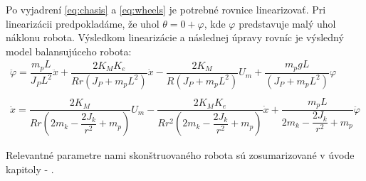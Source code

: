 Po vyjadrení \eqref{eq:chasis} a \eqref{eq:wheels} je potrebné rovnice linearizovať. Pri linearizácii predpokladáme, že uhol $\theta = 0 + \varphi$, kde $\varphi$ predstavuje malý uhol náklonu robota. Výsledkom linearizácie a následnej úpravy rovníc je výsledný model balansujúceho robota:
\begin{equation}
\begin{gathered}
\ddot{\varphi} = \dfrac{m_p L}{J_P L^2}\ddot{x} + \dfrac{2K_M K_e}{Rr(J_P + m_p L^2)}\dot{x} - \dfrac{2K_M}{R(J_P + m_p L^2)} U_m + \dfrac{m_p g L}{(J_P + m_p L^2)}\varphi
\\
\\
\ddot{x} = \dfrac{2K_M}{Rr(2m_k - \dfrac{2J_k}{r^2} + m_p)} U_m - \dfrac{2K_M K_e}{Rr^2(2m_k - \dfrac{2J_k}{r^2} + m_p) }\dot{x} + \dfrac{m_p L}{2m_k - \dfrac{2J_k}{r^2} + m_p}\ddot{\varphi}
\end{gathered}
\end{equation}

Relevantné parametre nami skonštruovaného robota sú zosumarizované v úvode kapitoly - .
